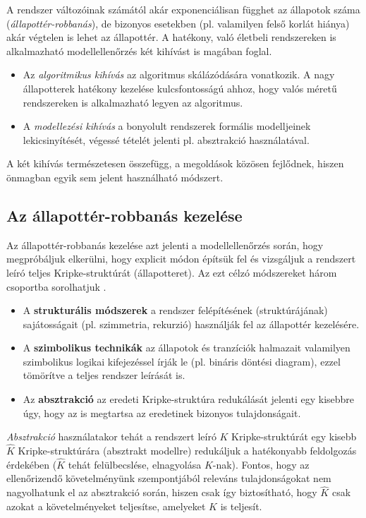 A rendszer változóinak számától akár exponenciálisan függhet az állapotok száma (\emph{állapottér-robbanás}), de bizonyos esetekben (pl. valamilyen felső korlát hiánya) akár végtelen is lehet az állapottér. A hatékony, való életbeli rendszereken is alkalmazható modellellenőrzés két kihívást is magában foglal.

\begin{itemize}
    \item Az \emph{algoritmikus kihívás} az algoritmus skálázódására vonatkozik. A nagy állapotterek hatékony kezelése kulcsfontosságú ahhoz, hogy valós méretű rendszereken is alkalmazható legyen az algoritmus.
    \item A \emph{modellezési kihívás} a bonyolult rendszerek formális modelljeinek lekicsinyítését, végessé tételét jelenti pl. absztrakció használatával.
\end{itemize}

A két kihívás természetesen összefügg, a megoldások közösen fejlődnek, hiszen önmagban egyik sem jelent használható módszert.

\subsection{Az állapottér-robbanás kezelése} \label{allapotterRobbanas}

Az állapottér-robbanás kezelése azt jelenti a modellellenőrzés során, hogy megpróbáljuk elkerülni, hogy explicit módon építsük fel és vizsgáljuk a rendszert leíró teljes Kripke-struktúrát (állapotteret). Az ezt célzó módszereket három csoportba sorolhatjuk \cite{IntroductionToModelChecking}.
\begin{itemize}
    \item A \textbf{strukturális módszerek} a rendszer felépítésének (struktúrájának) sajátosságait (pl. szimmetria, rekurzió) használják fel az állapottér kezelésére.
    \item A \textbf{szimbolikus technikák} az állapotok és tranzíciók halmazait valamilyen szimbolikus logikai kifejezéssel írják le (pl. bináris döntési diagram), ezzel tömörítve a teljes rendszer leírását is.
    \item Az \textbf{absztrakció} az eredeti Kripke-struktúra redukálását jelenti egy kisebbre úgy, hogy az is megtartsa az eredetinek bizonyos tulajdonságait.
\end{itemize}

\emph{Absztrakció} használatakor tehát a rendszert leíró $K$ Kripke-struktúrát egy kisebb $\hat{K}$ Kripke-struktúrára (absztrakt modellre) redukáljuk a hatékonyabb feldolgozás érdekében ($\hat{K}$ tehát felülbecslése, elnagyolása $K$-nak). Fontos, hogy az ellenőrizendő követelményünk szempontjából releváns tulajdonságokat nem nagyolhatunk el az absztrakció során, hiszen csak így biztosítható, hogy $\hat{K}$ csak azokat a követelményeket teljesítse, amelyeket $K$ is teljesít.


